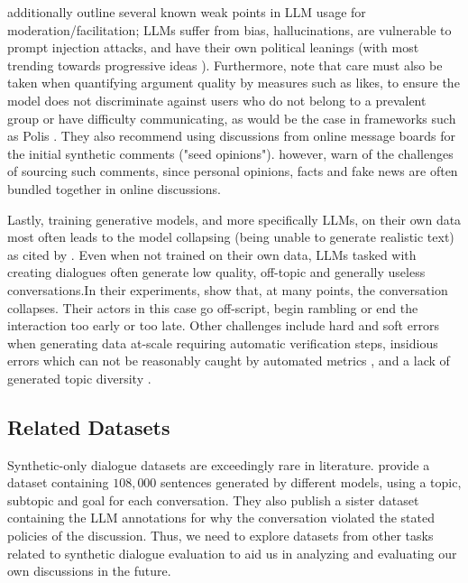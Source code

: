 \citet{small-polis-llm} additionally outline several known weak points in LLM usage for moderation/facilitation; LLMs suffer from bias, hallucinations, are vulnerable to prompt injection attacks, and have their own political leanings (with most trending towards progressive ideas \cite{Taubenfeld2024SystematicBI}). Furthermore, \citet{vecchi-2021-towards} note that care must also be taken when quantifying argument quality by measures such as likes, to ensure the model does not discriminate against users who do not belong to a prevalent group or have difficulty communicating, as would be the case in frameworks such as Polis \cite{small2021polis}. They also recommend using discussions from online message boards for the initial synthetic comments ("seed opinions"). \citet{vecchi-2021-towards} however, warn of the challenges of sourcing such comments, since personal opinions, facts and fake news are often bundled together in online discussions.

Lastly, training generative models, and more specifically LLMs, on their own data most often leads to the model collapsing (being unable to generate realistic text) \cite{alemohammad2023selfconsuminggenerativemodelsmad, shumailov2024curserecursiontraininggenerated} as cited by \citet{ulmer2024bootstrappingllmbasedtaskorienteddialogue}. Even when not trained on their own data, LLMs tasked with creating dialogues often generate low quality, off-topic and generally useless conversations.In their experiments, \citet{ulmer2024bootstrappingllmbasedtaskorienteddialogue} show that, at many points, the conversation collapses. Their actors in this case go off-script, begin rambling or end the interaction too early or too late. Other challenges include hard and soft errors when generating data at-scale \cite{lambert2024selfdirectedsyntheticdialoguesrevisions, ulmer2024bootstrappingllmbasedtaskorienteddialogue} requiring automatic verification steps, insidious errors which can not be reasonably caught by automated metrics \cite{lambert2024selfdirectedsyntheticdialoguesrevisions, ulmer2024bootstrappingllmbasedtaskorienteddialogue}, and a lack of generated topic diversity \cite{lambert2024selfdirectedsyntheticdialoguesrevisions}.


\subsection{Related Datasets}
\label{sec:related:datasets}

Synthetic-only dialogue datasets are exceedingly rare in literature. \cite{lambert2024selfdirectedsyntheticdialoguesrevisions} provide a dataset containing  $108,000$ sentences generated by different models, using a topic, subtopic and goal for each conversation. They also publish a sister dataset containing the LLM annotations for why the conversation violated the stated policies of the discussion. Thus, we need to explore datasets from other tasks related to synthetic dialogue evaluation to aid us in analyzing and evaluating our own discussions in the future.

